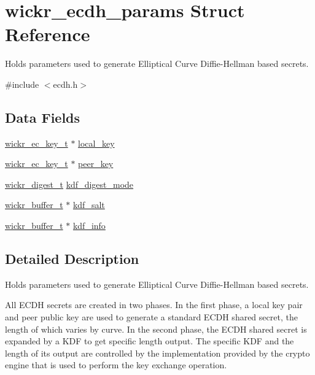 \hypertarget{structwickr__ecdh__params}{}\section{wickr\+\_\+ecdh\+\_\+params Struct Reference}
\label{structwickr__ecdh__params}


Holds parameters used to generate Elliptical Curve Diffie-\/\+Hellman based secrets.  




{\ttfamily \#include $<$ecdh.\+h$>$}

\subsection*{Data Fields}
\begin{DoxyCompactItemize}
\item 
\hyperlink{structwickr__ec__key}{wickr\+\_\+ec\+\_\+key\+\_\+t} $\ast$ \hyperlink{structwickr__ecdh__params_aab5a55e6a516ab8268ef6739ae1422cd}{local\+\_\+key}
\item 
\hyperlink{structwickr__ec__key}{wickr\+\_\+ec\+\_\+key\+\_\+t} $\ast$ \hyperlink{structwickr__ecdh__params_ab17d6191b23fa7fd1befd03b2eee4ba9}{peer\+\_\+key}
\item 
\hyperlink{structwickr__digest}{wickr\+\_\+digest\+\_\+t} \hyperlink{structwickr__ecdh__params_a8cffc5933efafe74e4b723516f2cd542}{kdf\+\_\+digest\+\_\+mode}
\item 
\hyperlink{structwickr__buffer}{wickr\+\_\+buffer\+\_\+t} $\ast$ \hyperlink{structwickr__ecdh__params_ad7e1b337665c957189e21a2d6dfe7cd8}{kdf\+\_\+salt}
\item 
\hyperlink{structwickr__buffer}{wickr\+\_\+buffer\+\_\+t} $\ast$ \hyperlink{structwickr__ecdh__params_a0259f327ae0bdcc9e44b1d43a1216cac}{kdf\+\_\+info}
\end{DoxyCompactItemize}


\subsection{Detailed Description}
Holds parameters used to generate Elliptical Curve Diffie-\/\+Hellman based secrets. 

All E\+C\+DH secrets are created in two phases. In the first phase, a local key pair and peer public key are used to generate a standard E\+C\+DH shared secret, the length of which varies by curve. In the second phase, the E\+C\+DH shared secret is expanded by a K\+DF to get specific length output. The specific K\+DF and the length of it\textquotesingle{}s output are controlled by the implementation provided by the crypto engine that is used to perform the key exchange operation. 

